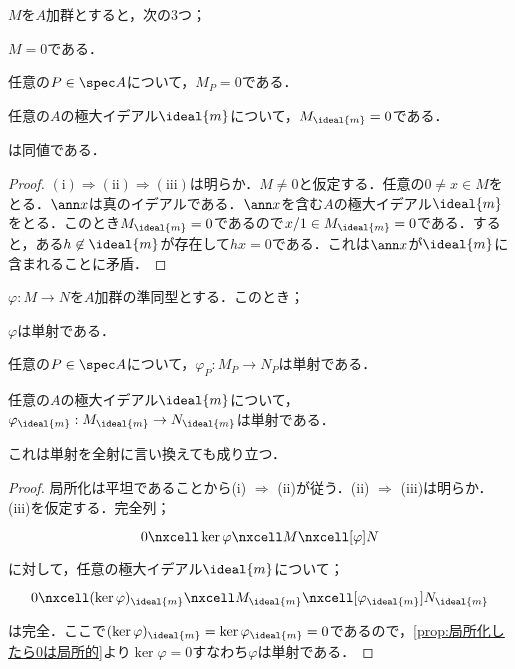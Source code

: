 \begin{prop}\label{prop:局所化したら0は局所的}
	$M$を$A$加群とすると，次の3つ；
	\begin{sakura}
		\item $M=0$である．
		\item 任意の$P\in \spec A$について，$M_P=0$である．
		\item 任意の$A$の極大イデアル$\ideal{m}$について，$M_{\ideal{m}}=0$である．
	\end{sakura}
	は同値である．
\end{prop}

\begin{proof}
	$(\text{i})\Longrightarrow(\text{ii})\Longrightarrow(\text{iii})$は明らか．$M\neq0$と仮定する．任意の$0\neq x\in M$をとる．$\ann x$は真のイデアルである．$\ann x$を含む$A$の極大イデアル$\ideal{m}$をとる．このとき$M_{\ideal{m}}=0$であるので$x/1\in M_{\ideal{m}}=0$である．すると，ある$h\not\in\ideal{m}$が存在して$hx=0$である．これは$\ann x$が$\ideal{m}$に含まれることに矛盾．
\end{proof}

\begin{prop}\label{prop:局所的性質}
	$\varphi:M\to N$を$A$加群の準同型とする．このとき；
	\begin{sakura}
		\item $\varphi$は単射である．
		\item 任意の$P\in\spec A$について，$\varphi_P:M_P\to N_P$は単射である．
		\item 任意の$A$の極大イデアル$\ideal{m}$について，
		$\varphi_{\ideal{m}}:M_{\ideal{m}}\to N_{\ideal{m}}$は単射である．
	\end{sakura}
	これは単射を全射に言い換えても成り立つ．
\end{prop}

\begin{proof}
	局所化は平坦であることから(i) $\Longrightarrow$ (ii)が従う．(ii) $\Longrightarrow$ (iii)は明らか．(iii)を仮定する．完全列；
	\[\begin{tikzcd}
	0\nxcell\ker\varphi\nxcell M\nxcell[\varphi]N
	\end{tikzcd}\]
	に対して，任意の極大イデアル$\ideal{m}$について；
	\[\begin{tikzcd}
	0\nxcell(\ker\varphi)_{\ideal{m}}\nxcell M_{\ideal{m}}\nxcell[\varphi_{\ideal{m}}]N_{\ideal{m}}
	\end{tikzcd}\]
	は完全．ここで$(\ker\varphi)_{\ideal{m}}=\ker\varphi_{\ideal{m}}=0$であるので，\ref{prop:局所化したら0は局所的}より$\ker\varphi=0$すなわち$\varphi$は単射である．
\end{proof}

